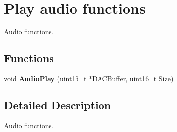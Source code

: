 \hypertarget{group___play}{}\section{Play audio functions}
\label{group___play}


Audio functions.  


\subsection*{Functions}
\begin{DoxyCompactItemize}
\item 
\mbox{\label{group___play_gab9a4c697931a5533588e4b18a909fd1d}} 
void {\bfseries Audio\+Play} (uint16\+\_\+t $\ast$D\+A\+C\+Buffer, uint16\+\_\+t Size)
\end{DoxyCompactItemize}


\subsection{Detailed Description}
Audio functions. 

